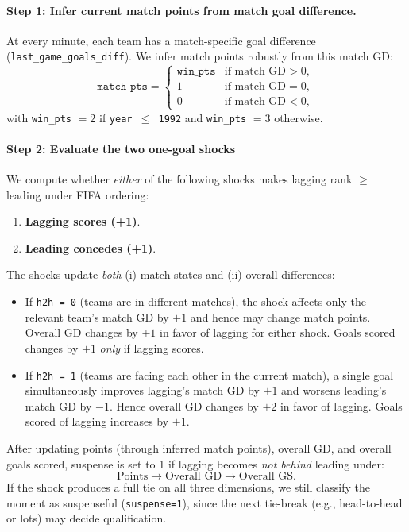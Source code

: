 \documentclass[11pt]{article}
\begin{document}
\paragraph{Step 1: Infer current match points from match goal difference.}
At every minute, each team has a match-specific goal difference (\texttt{last\_game\_goals\_diff}).
We infer match points robustly from this match GD:
\[
\texttt{match\_pts} =
\begin{cases}
\texttt{win\_pts} & \text{if match GD} > 0,\\
1 & \text{if match GD} = 0,\\
0 & \text{if match GD} < 0,
\end{cases}
\]
with \texttt{win\_pts} $=2$ if \texttt{year $\le$ 1992} and \texttt{win\_pts} $=3$ otherwise.

\paragraph{Step 2: Evaluate the two one-goal shocks }

We compute whether \emph{either} of the following shocks makes lagging rank $\ge$ leading under FIFA ordering:
\begin{enumerate}
    \item \textbf{Lagging scores (+1)}.
    \item \textbf{Leading concedes (+1)}.
\end{enumerate}

\noindent The shocks update \emph{both} (i) match states and (ii) overall differences:
\begin{itemize}
    \item If \texttt{h2h = 0} (teams are in different matches), the shock affects only the relevant team's match GD by $\pm 1$ and hence may change match points. Overall GD changes by $+1$ in favor of lagging for either shock. Goals scored changes by $+1$ \emph{only} if lagging scores.
    \item If \texttt{h2h = 1} (teams are facing each other in the current match), a single goal simultaneously improves lagging's match GD by $+1$ and worsens leading's match GD by $-1$. Hence overall GD changes by $+2$ in favor of lagging. Goals scored of lagging increases by $+1$.
\end{itemize}

\noindent After updating points (through inferred match points), overall GD, and overall goals scored, suspense is set to 1 if lagging becomes \emph{not behind} leading under:
\[
\text{Points} \rightarrow \text{Overall GD} \rightarrow \text{Overall GS}.
\]
If the shock produces a full tie on all three dimensions, we still classify the moment as suspenseful (\texttt{suspense=1}), since the next tie-break (e.g., head-to-head or lots) may decide qualification.
\end{document}
